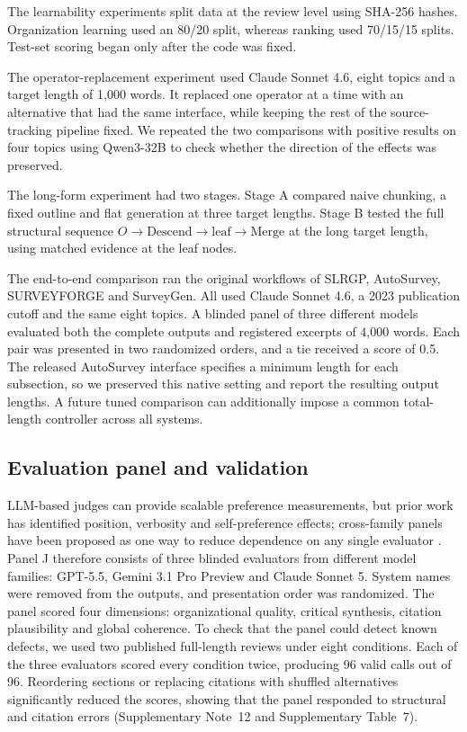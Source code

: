 \documentclass[11pt,a4paper]{article}
\begin{document}
The learnability experiments split data at the review level using SHA-256 hashes. Organization learning used an 80/20 split, whereas ranking used 70/15/15 splits. Test-set scoring began only after the code was fixed.

The operator-replacement experiment used Claude Sonnet 4.6, eight topics and a target length of 1,000 words. It replaced one operator at a time with an alternative that had the same interface, while keeping the rest of the source-tracking pipeline fixed. We repeated the two comparisons with positive results on four topics using Qwen3-32B to check whether the direction of the effects was preserved.

The long-form experiment had two stages. Stage A compared naive chunking, a fixed outline and flat generation at three target lengths. Stage B tested the full structural sequence $O\rightarrow\text{Descend}\rightarrow\text{leaf}\rightarrow\text{Merge}$ at the long target length, using matched evidence at the leaf nodes.

The end-to-end comparison ran the original workflows of SLRGP, AutoSurvey\cite{autosurvey}, SURVEYFORGE\cite{surveyforge} and SurveyGen\cite{surveygen}. All used Claude Sonnet 4.6, a 2023 publication cutoff and the same eight topics. A blinded panel of three different models evaluated both the complete outputs and registered excerpts of 4,000 words. Each pair was presented in two randomized orders, and a tie received a score of 0.5. The released AutoSurvey interface specifies a minimum length for each subsection, so we preserved this native setting and report the resulting output lengths. A future tuned comparison can additionally impose a common total-length controller across all systems.

\subsection*{Evaluation panel and validation}

LLM-based judges can provide scalable preference measurements, but prior work has identified position, verbosity and self-preference effects; cross-family panels have been proposed as one way to reduce dependence on any single evaluator \cite{llmjudge,selfpreference,poll}. Panel J therefore consists of three blinded evaluators from different model families: GPT-5.5, Gemini 3.1 Pro Preview and Claude Sonnet 5. System names were removed from the outputs, and presentation order was randomized. The panel scored four dimensions: organizational quality, critical synthesis, citation plausibility and global coherence. To check that the panel could detect known defects, we used two published full-length reviews under eight conditions. Each of the three evaluators scored every condition twice, producing 96 valid calls out of 96. Reordering sections or replacing citations with shuffled alternatives significantly reduced the scores, showing that the panel responded to structural and citation errors (Supplementary Note~12 and Supplementary Table~7).
\end{document}
